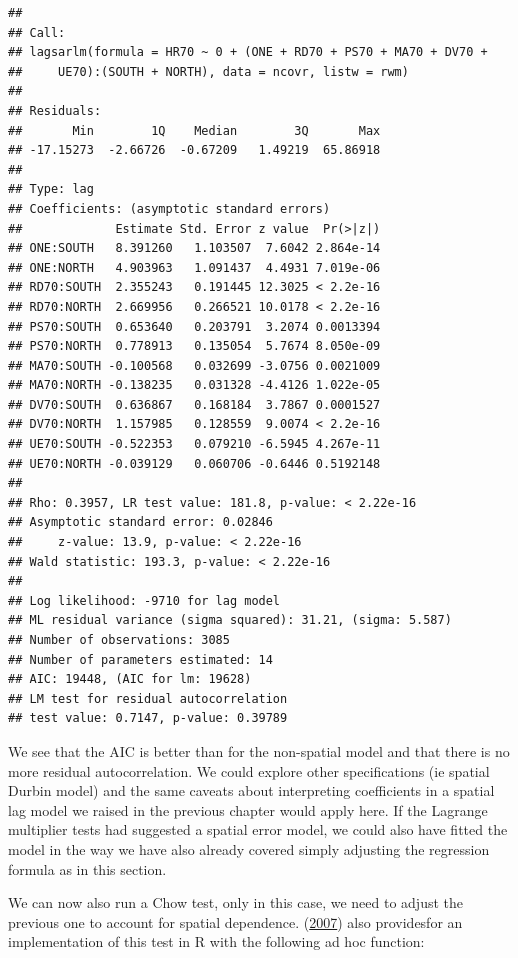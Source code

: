 \documentclass[
  krantz2]{krantz}
\begin{document}
\begin{verbatim}
## 
## Call:
## lagsarlm(formula = HR70 ~ 0 + (ONE + RD70 + PS70 + MA70 + DV70 + 
##     UE70):(SOUTH + NORTH), data = ncovr, listw = rwm)
## 
## Residuals:
##       Min        1Q    Median        3Q       Max 
## -17.15273  -2.66726  -0.67209   1.49219  65.86918 
## 
## Type: lag 
## Coefficients: (asymptotic standard errors) 
##             Estimate Std. Error z value  Pr(>|z|)
## ONE:SOUTH   8.391260   1.103507  7.6042 2.864e-14
## ONE:NORTH   4.903963   1.091437  4.4931 7.019e-06
## RD70:SOUTH  2.355243   0.191445 12.3025 < 2.2e-16
## RD70:NORTH  2.669956   0.266521 10.0178 < 2.2e-16
## PS70:SOUTH  0.653640   0.203791  3.2074 0.0013394
## PS70:NORTH  0.778913   0.135054  5.7674 8.050e-09
## MA70:SOUTH -0.100568   0.032699 -3.0756 0.0021009
## MA70:NORTH -0.138235   0.031328 -4.4126 1.022e-05
## DV70:SOUTH  0.636867   0.168184  3.7867 0.0001527
## DV70:NORTH  1.157985   0.128559  9.0074 < 2.2e-16
## UE70:SOUTH -0.522353   0.079210 -6.5945 4.267e-11
## UE70:NORTH -0.039129   0.060706 -0.6446 0.5192148
## 
## Rho: 0.3957, LR test value: 181.8, p-value: < 2.22e-16
## Asymptotic standard error: 0.02846
##     z-value: 13.9, p-value: < 2.22e-16
## Wald statistic: 193.3, p-value: < 2.22e-16
## 
## Log likelihood: -9710 for lag model
## ML residual variance (sigma squared): 31.21, (sigma: 5.587)
## Number of observations: 3085 
## Number of parameters estimated: 14 
## AIC: 19448, (AIC for lm: 19628)
## LM test for residual autocorrelation
## test value: 0.7147, p-value: 0.39789
\end{verbatim}

We see that the AIC is better than for the non-spatial model and that there is no more residual autocorrelation. We could explore other specifications (ie spatial Durbin model) and the same caveats about interpreting coefficients in a spatial lag model we raised in the previous chapter would apply here. If the Lagrange multiplier tests had suggested a spatial error model, we could also have fitted the model in the way we have also already covered simply adjusting the regression formula as in this section.

We can now also run a Chow test, only in this case, we need to adjust the previous one to account for spatial dependence. (\protect\hyperlink{ref-Anselin_2007}{2007}) also providesfor an implementation of this test in R with the following ad hoc function:
\end{document}
